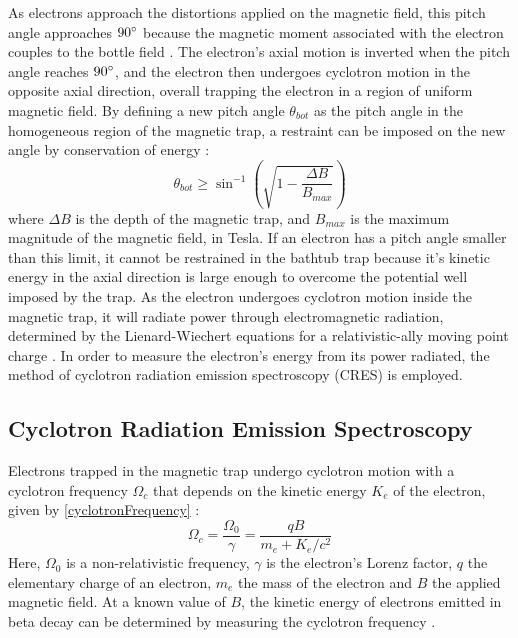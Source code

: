 \documentclass[a4paper,12pt, notitlepage]{article}
\begin{document}
As electrons approach the distortions applied on the magnetic field, this pitch angle approaches $90 \degree$ because the magnetic moment associated with the electron couples to the bottle field \cite{Brown1986}. The electron's axial motion is inverted when the pitch angle reaches $90 \degree$, and the electron then undergoes cyclotron motion in the opposite axial direction, overall trapping the electron in a region of uniform magnetic field.
By defining a new pitch angle $\theta_{bot}$ as the pitch angle in the homogeneous region of the magnetic trap, a restraint can be imposed on the new angle by conservation of energy \cite{Ashtari2019}:
\begin{equation} \label{eq:pitchAngleCondition}
    \theta_{bot} \geq \sin^{-1}\left(\sqrt{1 - \frac{\Delta B}{B_{max}}}\right)
\end{equation}
where $\Delta B$ is the depth of the magnetic trap, and $B_{max}$ is the maximum magnitude of the magnetic field, in Tesla.
If an electron has a pitch angle smaller than this limit, it cannot be restrained in the bathtub trap because it's kinetic energy in the axial direction is large enough to overcome the potential well imposed by the trap.
As the electron undergoes cyclotron motion inside the magnetic trap, it will radiate power through electromagnetic radiation, determined by the Lienard-Wiechert equations for a relativistic-ally moving point charge \cite{Jackson1999}. In order to measure the electron's energy from its power radiated, the method of cyclotron radiation emission spectroscopy (CRES) is employed.
\subsection{Cyclotron Radiation Emission Spectroscopy}
Electrons trapped in the magnetic trap undergo cyclotron motion with a cyclotron frequency $\Omega_{c}$ that depends on the kinetic energy $K_{e}$ of the electron, given by \cref{cyclotronFrequency} \cite{Monreal2009,Ashtari2019,Asner2015}:
\begin{equation} \label{cyclotronFrequency}
    \Omega_{c} = \dfrac{\Omega_{0}}{\gamma} = \dfrac{qB}{m_{e} + K_{e} / c^{2}} 
\end{equation}
Here, $\Omega_{0}$ is a non-relativistic frequency, $\gamma$ is the electron's Lorenz factor, $q$ the elementary charge of an electron, $m_{e}$ the mass of the electron and $B$ the applied magnetic field.
At a known value of $B$, the kinetic energy of electrons emitted in beta decay can be determined by measuring the cyclotron frequency \cite{Asner2015}.  
\end{document}
